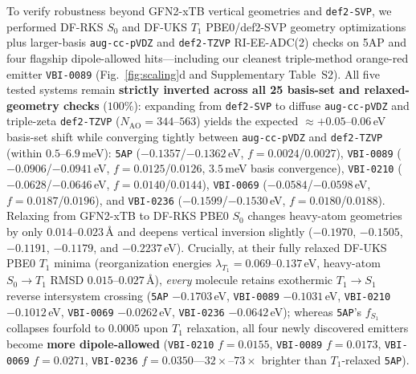 \documentclass[10pt,twocolumn]{article}
\theoremstyle{natthm}
\begin{document}
To verify robustness beyond GFN2-xTB vertical geometries and \texttt{def2-SVP}, we performed DF-RKS $S_0$ and DF-UKS $T_1$ PBE0/def2-SVP geometry optimizations\cite{wang2016geometric} plus larger-basis \texttt{aug-cc-pVDZ} and \texttt{def2-TZVP} RI-EE-ADC(2) checks on 5AP and four flagship dipole-allowed hits---including our cleanest triple-method orange-red emitter \texttt{VBI-0089} (Fig.~\ref{fig:scaling}d and Supplementary Table~S2).
All five tested systems remain \textbf{strictly inverted across all 25 basis-set and relaxed-geometry checks} ($100\%$): expanding from \texttt{def2-SVP} to diffuse \texttt{aug-cc-pVDZ} and triple-zeta \texttt{def2-TZVP} ($N_{\mathrm{AO}}=344$--$563$) yields the expected $\approx +0.05$--$0.06$\,eV basis-set shift\cite{loos2023invest} while converging tightly between \texttt{aug-cc-pVDZ} and \texttt{def2-TZVP} (within $0.5$--$6.9$\,meV): \texttt{5AP} ($-0.1357$/$-0.1362$\,eV, $f=0.0024$/$0.0027$), \texttt{VBI-0089} ($-0.0906$/$-0.0941$\,eV, $f=0.0125$/$0.0126$, $3.5$\,meV basis convergence), \texttt{VBI-0210} ($-0.0628$/$-0.0646$\,eV, $f=0.0140$/$0.0144$), \texttt{VBI-0069} ($-0.0584$/$-0.0598$\,eV, $f=0.0187$/$0.0196$), and \texttt{VBI-0236} ($-0.1599$/$-0.1530$\,eV, $f=0.0180$/$0.0188$).
Relaxing from GFN2-xTB to DF-RKS PBE0 $S_0$ changes heavy-atom geometries by only $0.014$--$0.023$\,\AA{} and deepens vertical inversion slightly ($-0.1970$, $-0.1505$, $-0.1191$, $-0.1179$, and $-0.2237$\,eV). Crucially, at their fully relaxed DF-UKS PBE0 $T_1$ minima (reorganization energies $\lambda_{T_1}=0.069$--$0.137$\,eV, heavy-atom $S_0\to T_1$ RMSD $0.015$--$0.027$\,\AA), \emph{every} molecule retains exothermic $T_1\to S_1$ reverse intersystem crossing (\texttt{5AP} $-0.1703$\,eV, \texttt{VBI-0089} $-0.1031$\,eV, \texttt{VBI-0210} $-0.1012$\,eV, \texttt{VBI-0069} $-0.0262$\,eV, \texttt{VBI-0236} $-0.0642$\,eV); whereas \texttt{5AP}'s $f_{S_1}$ collapses fourfold to $0.0005$ upon $T_1$ relaxation, all four newly discovered emitters become \textbf{more dipole-allowed} (\texttt{VBI-0210} $f=0.0155$, \texttt{VBI-0089} $f=0.0173$, \texttt{VBI-0069} $f=0.0271$, \texttt{VBI-0236} $f=0.0350$---$32\times$--$73\times$ brighter than $T_1$-relaxed \texttt{5AP}).
\end{document}

